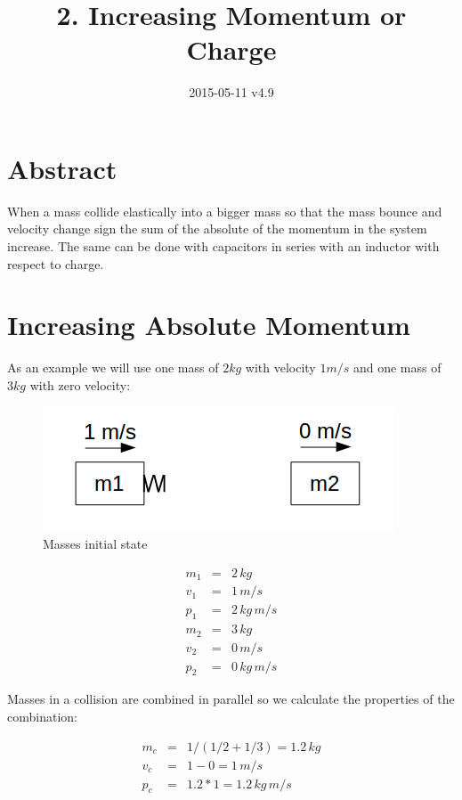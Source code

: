 \documentclass[]{../common/elementary-physics}
\title{2. Increasing Momentum or Charge}
\date{2015-05-11 v4.9}
\begin{document}
\maketitle

\tableofcontents

\section{Abstract}

When a mass collide elastically into a bigger mass so that the mass bounce and velocity change sign the sum of the absolute of the momentum in the system increase.
The same can be done with capacitors in series with an inductor with respect to charge.

\section{Increasing Absolute Momentum}

As an example we will use one mass of $2 kg$ with velocity $1 m/s$ and one mass of $3 kg$ with zero velocity:

\begin{figure}[ht] \centering
	\includegraphics[scale=.5]{mms4} \caption{Masses initial state}
\end{figure}

\begin{eqnarray}
m_1 &=& 2 \, kg \\
v_1 &=& 1 \, m/s \\
p_1 &=& 2 \, kg \, m/s \\
m_2 &=& 3 \, kg \\
v_2 &=& 0 \, m/s \\
p_2 &=& 0 \, kg \, m/s
\end{eqnarray}

Masses in a collision are combined in parallel\cite{ef1ch} so we calculate the properties of the combination:

\begin{eqnarray}
m_c &=& 1/(1/2 + 1/3) = 1.2 \, kg \\
v_c &=& 1 - 0 = 1 \, m/s \\
p_c &=& 1.2 * 1 = 1.2 \, kg \, m/s
\end{eqnarray}
\end{document}

